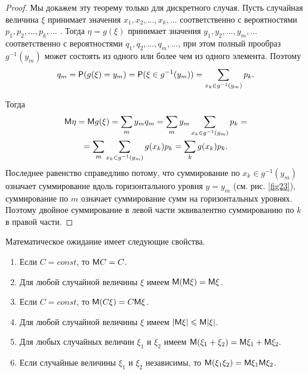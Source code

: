 \begin{proof}
	Мы докажем эту теорему только для дискретного случая.
Пусть случайная величина $\xi$ принимает значения $x_1, x_2,\ldots, x_k, \ldots$ соответственно с вероятностями $p_1, p_2,\ldots , p_k,\ldots$ . Тогда $\eta= g(\xi)$ принимает
значения $y_1, y_2, \ldots , y_m, \ldots$ соответственно с вероятностями $q_1, q_2,\ldots, q_m,\ldots $, при этом полный прообраз $g^{−1}(y_m)$ может состоять из одного или более чем из одного элемента. Поэтому
	\begin{equation*}
		q_m=\P(g(\xi)=y_m)=\P(\xi\in g^{-1}(y_m))=\sum\limits
		_{x_k\in g^{-1}(y_m)}p_k.
	\end{equation*}

	Тогда
	\begin{gather*}
	\M\eta=\M g(\xi)=\sum_m y_mq_m=\sum_m y_m \sum
	\limits_{x_k\in g^{-1}(y_m)} p_k=\\=
	\sum_m\sum\limits_{x_k\in g^{-1}(y_m)}g(x_k)p_k=\sum_kg(x_k)p_k.
	\end{gather*}
	Последнее равенство справедливо потому, что суммирование по $x_k\in g^{-1}(y_m)$ означает суммирование вдоль горизонтального уровня $y = y_m$ (см. рис. \ref{fig23}), суммирование по $m$ означает суммирование сумм на горизонтальных уровнях. Поэтому двойное суммирование в левой части эквивалентно суммированию по $k$ в правой части.
\end{proof}

\begin{theorem}
Математическое ожидание имеет следующие свойства.
\begin{enumerate}
	\item Если $C = const$, то $\M C = C$.
	\item Для любой случайной величины $\xi$ имеем $\M(\M\xi) = \M\xi$.
	\item Если $C = const$, то $\M(C\xi) = C\M\xi$.
	\item Для любой случайной величины $\xi$ имеем $|\M\xi| \leqslant \M|\xi|$. 
	\item Для любых случайных величин $\xi_1$ и $\xi_2$ имеем $\M(\xi_1 + \xi_2) = \M\xi_1 +\M\xi_2.$
	\item Если случайные величины $\xi_1$ и $\xi_2$ независимы, то $\M(\xi_1\xi_2) = \M\xi_1\M\xi_2$.
\end{enumerate}
\end{theorem}

